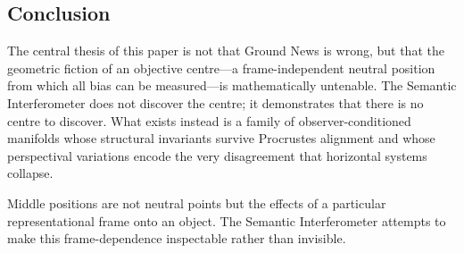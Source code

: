 \subsection{Conclusion}

The central thesis of this paper is not that Ground News is wrong, but that the geometric fiction of an objective centre---a frame-independent neutral position from which all bias can be measured---is mathematically untenable. The Semantic Interferometer does not discover the centre; it demonstrates that there is no centre to discover. What exists instead is a family of observer-conditioned manifolds whose structural invariants survive Procrustes alignment and whose perspectival variations encode the very disagreement that horizontal systems collapse.

Middle positions are not neutral points but the effects of a particular representational frame onto an object. The Semantic Interferometer attempts to make this frame-dependence inspectable rather than invisible.



